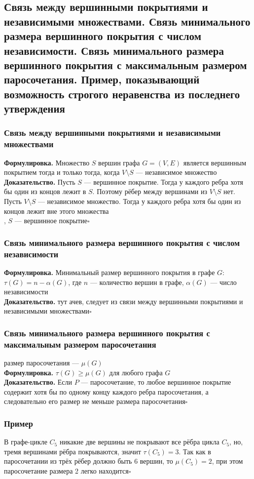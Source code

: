 \documentclass[a4paper]{article}
\newcommand{\qed}{\hfill$\square$}
\begin{document}
\subsection{Связь между вершинными покрытиями и независимыми множествами. Связь минимального размера вершинного покрытия с числом независимости. Связь минимального размера вершинного покрытия с максимальным размером паросочетания. Пример, показывающий возможность строгого неравенства из последнего утверждения}
\subsubsection*{Связь между вершинными покрытиями и независимыми множествами}
\textbf{Формулировка.} Множество $S$ вершин графа $G=(V,E)$ является вершинным покрытием тогда и только тогда, когда $V\setminus S$ — независимое множество\\[2mm]
\indent\textbf{Доказательство.} Пусть $S$ — вершинное покрытие. Тогда у каждого ребра хотя бы один из концов лежит в $S$. Поэтому рёбер между вершинами из $V\setminus S$ нет.
Пусть $V\setminus S$ — независимое множество. Тогда у каждого ребра хотя бы один из концов лежит вне этого множества\\
, $S$ — вершинное покрытие\qed
\subsubsection*{Связь минимального размера вершинного покрытия с числом независимости}
\textbf{Формулировка.} Минимальный размер вершинного покрытия в графе $G$: $\tau(G)=n-\alpha(G)$, где $n$ — количество вершин в графе, $\alpha(G)$ — число независимости\\[2mm]
\indent\textbf{Доказательство.} тут ачев, следует из связи между вершинными покрытиями и независимыми множествами\qed
\subsubsection*{Связь минимального размера вершинного покрытия с максимальным размером паросочетания}
 размер паросочетания — $\mu(G)$\\[2mm]
\indent\textbf{Формулировка.} $\tau(G)\geqslant\mu(G)$ для любого графа $G$\\[2mm]
\indent\textbf{Доказательство.} Если $P$ — паросочетание, то любое вершинное покрытие содержит хотя бы по одному концу каждого ребра паросочетания, а следовательно его размер не меньше размера паросочетания\qed
\label{2.17}
\subsubsection*{Пример}
В графе-цикле $C_5$ никакие две вершины не покрывают все рёбра цикла $C_5$, но, тремя вершинами рёбра покрываются, значит $\tau(C_5) = 3$. Так как в паросочетании из трёх рёбер должно быть 6 вершин, то $\mu(C_5) = 2$, при этом паросочетание размера 2 легко находится\qed
\end{document}
